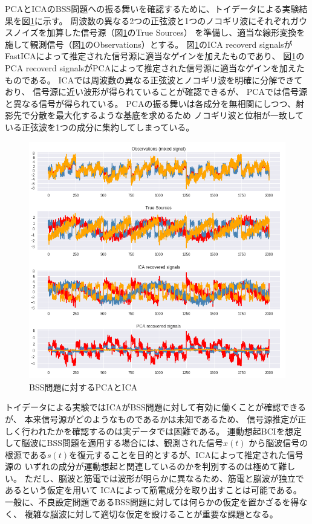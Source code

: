 PCAとICAのBSS問題への振る舞いを確認するために、トイデータによる実験結果を図\ref{fig:bss}に示す。
周波数の異なる2つの正弦波と1つのノコギリ波にそれぞれガウスノイズを加算した信号源（図\ref{fig:bss}のTrue Sources）
を準備し、適当な線形変換を施して観測信号（図\ref{fig:bss}のObservations）とする。
図\ref{fig:bss}のICA recoverd signalsがFastICAによって推定された信号源に適当なゲインを加えたものであり、
図\ref{fig:bss}のPCA recoverd signalsがPCAによって推定された信号源に適当なゲインを加えたものである。
ICAでは周波数の異なる正弦波とノコギリ波を明確に分解できており、
信号源に近い波形が得られていることが確認できるが、
PCAでは信号源と異なる信号が得られている。
PCAの振る舞いは各成分を無相関にしつつ、射影先で分散を最大化するような基底を求めるため
ノコギリ波と位相が一致している正弦波を1つの成分に集約してしまっている。

\begin{figure}
    \centering
    \includegraphics[width=15cm]{images/bss.png}
    \caption{BSS問題に対するPCAとICA}
    \label{fig:bss}
\end{figure}

トイデータによる実験ではICAがBSS問題に対して有効に働くことが確認できるが、
本来信号源がどのようなものであるかは未知であるため、
信号源推定が正しく行われたかを確認するのは実データでは困難である。
運動想起BCIを想定して脳波にBSS問題を適用する場合には、観測された信号\(x(t)\)
から脳波信号の根源である\(s(t)\)を復元することを目的とするが、ICAによって推定された信号源の
いずれの成分が運動想起と関連しているのかを判別するのは極めて難しい。
ただし、脳波と筋電では波形が明らかに異なるため、筋電と脳波が独立であるという仮定を用いて
ICAによって筋電成分を取り出すことは可能である。
一般に、不良設定問題であるBSS問題に対しては何らかの仮定を置かざるを得なく、
複雑な脳波に対して適切な仮定を設けることが重要な課題となる。